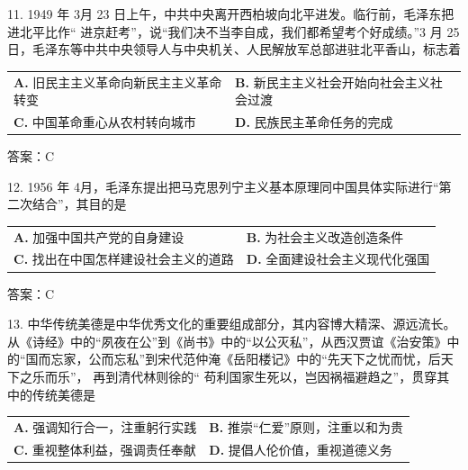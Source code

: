 \documentclass[UTF8,11pt]{ctexart}
\begin{document}
11. 1949 年 3月 23 日上午，中共中央离开西柏坡向北平进发。临行前，毛泽东把进北平比作“ 进京赶考”，说“我们决不当李自成，我们都希望考个好成绩。”3 月 25 日，毛泽东等中共中央领导人与中央机关、人民解放军总部进驻北平香山，标志着


\begin{center}\begin{tabular}{>{\raggedright\arraybackslash}p{\dimexpr(\linewidth-4\tabcolsep)/2\relax}>{\raggedright\arraybackslash}p{\dimexpr(\linewidth-4\tabcolsep)/2\relax}}
\textbf{A.} 旧民主主义革命向新民主主义革命转变 & \textbf{B.} 新民主主义社会开始向社会主义社会过渡\\[.35em]
\textbf{C.} 中国革命重心从农村转向城市 & \textbf{D.} 民族民主革命任务的完成\\[.35em]\end{tabular}\end{center}

答案：C


12. 1956 年 4月，毛泽东提出把马克思列宁主义基本原理同中国具体实际进行“第二次结合”，其目的是


\begin{center}\begin{tabular}{>{\raggedright\arraybackslash}p{\dimexpr(\linewidth-4\tabcolsep)/2\relax}>{\raggedright\arraybackslash}p{\dimexpr(\linewidth-4\tabcolsep)/2\relax}}
\textbf{A.} 加强中国共产党的自身建设 & \textbf{B.} 为社会主义改造创造条件\\[.35em]
\textbf{C.} 找出在中国怎样建设社会主义的道路 & \textbf{D.} 全面建设社会主义现代化强国\\[.35em]\end{tabular}\end{center}

答案：C


13. 中华传统美德是中华优秀文化的重要组成部分，其内容博大精深、源远流长。从《诗经》中的“夙夜在公”到《尚书》中的“以公灭私”，从西汉贾谊《治安策》中的“国而忘家，公而忘私”到宋代范仲淹《岳阳楼记》中的“先天下之忧而忧，后天下之乐而乐”， 再到清代林则徐的“ 苟利国家生死以，岂因祸福避趋之”，贯穿其中的传统美德是


\begin{center}\begin{tabular}{>{\raggedright\arraybackslash}p{\dimexpr(\linewidth-4\tabcolsep)/2\relax}>{\raggedright\arraybackslash}p{\dimexpr(\linewidth-4\tabcolsep)/2\relax}}
\textbf{A.} 强调知行合一，注重躬行实践 & \textbf{B.} 推崇“仁爱”原则，注重以和为贵\\[.35em]
\textbf{C.} 重视整体利益，强调责任奉献 & \textbf{D.} 提倡人伦价值，重视道德义务\\[.35em]\end{tabular}\end{center}
\end{document}
